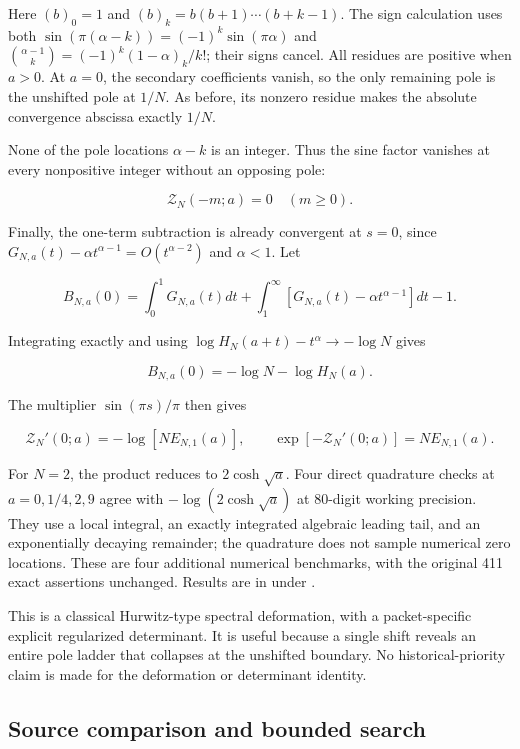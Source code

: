 Here \((b)_0=1\) and \((b)_k=b(b+1)\cdots(b+k-1)\). The sign calculation
uses both \(\sin(\pi(\alpha-k))=(-1)^k\sin(\pi\alpha)\) and
\(\binom{\alpha-1}{k}=(-1)^k(1-\alpha)_k/k!\); their signs cancel. All
residues are positive when \(a>0\). At \(a=0\), the secondary
coefficients vanish, so the only remaining pole is the unshifted pole at
\(1/N\). As before, its nonzero residue makes the absolute convergence
abscissa exactly \(1/N\).

None of the pole locations \(\alpha-k\) is an integer. Thus the sine
factor vanishes at every nonpositive integer without an opposing pole:

\[
\boxed{\mathcal Z_N(-m;a)=0\quad(m\ge0).}
\tag{T8}
\]

Finally, the one-term subtraction is already convergent at \(s=0\),
since \(G_{N,a}(t)-\alpha t^{\alpha-1}=O(t^{\alpha-2})\) and
\(\alpha<1\). Let

\[
B_{N,a}(0)=\int_0^1G_{N,a}(t)dt
 +\int_1^\infty[G_{N,a}(t)-\alpha t^{\alpha-1}]dt-1.
\]

Integrating exactly and using \(\log H_N(a+t)-t^\alpha\to-\log N\) gives

\[
B_{N,a}(0)=-\log N-\log H_N(a).
\]

The multiplier \(\sin(\pi s)/\pi\) then gives

\[
\boxed{\mathcal Z_N'(0;a)=-\log[N E_{N,1}(a)],\qquad
       \exp[-\mathcal Z_N'(0;a)]=N E_{N,1}(a).}
\tag{T9}
\]

For \(N=2\), the product reduces to \(2\cosh\sqrt a\). Four direct
quadrature checks at \(a=0,1/4,2,9\) agree with \(-\log(2\cosh\sqrt a)\)
at 80-digit working precision. They use a local integral, an exactly
integrated algebraic leading tail, and an exponentially decaying
remainder; the quadrature does not sample numerical zero locations.
These are four additional numerical benchmarks, with the original 411
exact assertions unchanged. Results are in
 under
.

This is a classical Hurwitz-type spectral deformation, with a
packet-specific explicit regularized determinant. It is useful because a
single shift reveals an entire pole ladder that collapses at the
unshifted boundary. No historical-priority claim is made for the
deformation or determinant identity.

\hypertarget{source-comparison-and-bounded-search}{%
\subsection{Source comparison and bounded
search}\label{source-comparison-and-bounded-search}}

